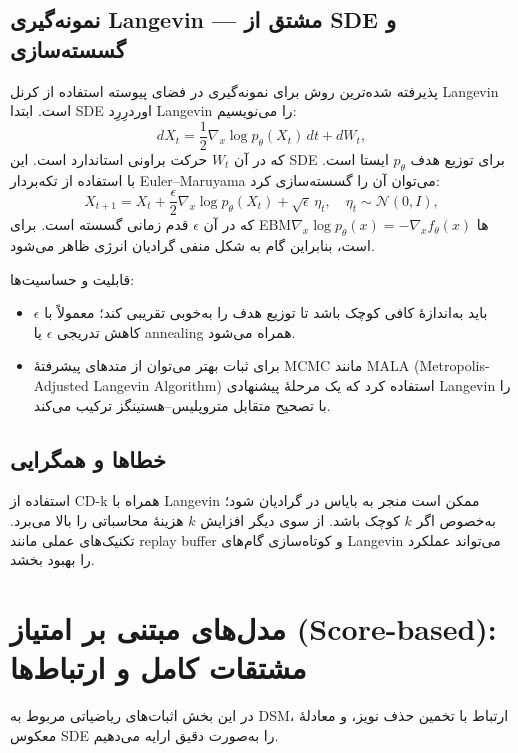 \subsection{نمونه‌گیری Langevin — مشتق از SDE و گسسته‌سازی}
پذیرفته شده‌ترین روش برای نمونه‌گیری در فضای پیوسته استفاده از کرنل Langevin است. ابتدا SDE اوردرِرِد Langevin را می‌نویسیم:
\begin{equation}
dX_t = \frac{1}{2} \nabla_x \log p_{\theta}(X_t)\,dt + dW_t,
\end{equation}
که در آن \(W_t\) حرکت براونی استاندارد است. این SDE برای توزیع هدف \(p_{\theta}\) ایستا است. با استفاده از تکه‌بردار Euler–Maruyama می‌توان آن را گسسته‌سازی کرد:
\begin{equation}\label{eq:langevin_discrete}
X_{t+1} = X_t + \frac{\epsilon}{2} \nabla_x \log p_{\theta}(X_t) + \sqrt{\epsilon}\,\eta_t, \quad \eta_t \sim \mathcal{N}(0,I),
\end{equation}
که در آن \(\epsilon\) قدم زمانی گسسته است. برای EBMها \(\nabla_x \log p_{\theta}(x) = -\nabla_x f_{\theta}(x)\) است، بنابراین گام به شکل منفی گرادیان انرژی ظاهر می‌شود.

قابلیت و حساسیت‌ها:
\begin{itemize}
    \item \(\epsilon\) باید به‌اندازهٔ کافی کوچک باشد تا توزیع هدف را به‌خوبی تقریبی کند؛ معمولاً با کاهش تدریجی \(\epsilon\) یا annealing همراه می‌شود.
    \item برای ثبات بهتر می‌توان از متدهای پیشرفتهٔ MCMC مانند MALA (Metropolis-Adjusted Langevin Algorithm) استفاده کرد که یک مرحلهٔ پیشنهادی Langevin را با تصحیح متقابل متروپلیس–هستینگز ترکیب می‌کند.
\end{itemize}

\subsection{خطاها و همگرایی}
استفاده از CD-k همراه با Langevin ممکن است منجر به بایاس در گرادیان شود؛ به‌خصوص اگر \(k\) کوچک باشد. از سوی دیگر افزایش \(k\) هزینهٔ محاسباتی را بالا می‌برد. تکنیک‌های عملی مانند replay buffer و کوتاه‌سازی گام‌های Langevin می‌تواند عملکرد را بهبود بخشد.

\section{مدل‌های مبتنی بر امتیاز (Score-based): مشتقات کامل و ارتباط‌ها}
در این بخش اثبات‌های ریاضیاتی مربوط به DSM، ارتباط با تخمین حذف نویز، و معادلهٔ معکوس SDE را به‌صورت دقیق ارایه می‌دهیم.

